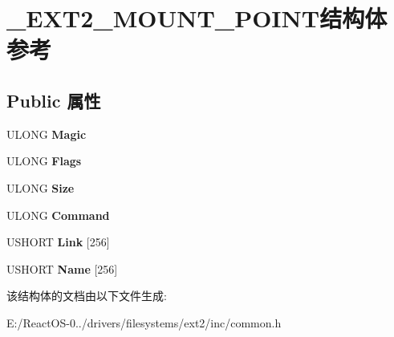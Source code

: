 \hypertarget{struct___e_x_t2___m_o_u_n_t___p_o_i_n_t}{}\section{\+\_\+\+E\+X\+T2\+\_\+\+M\+O\+U\+N\+T\+\_\+\+P\+O\+I\+N\+T结构体 参考}
\label{struct___e_x_t2___m_o_u_n_t___p_o_i_n_t}
\subsection*{Public 属性}
\begin{DoxyCompactItemize}
\item 
\mbox{\label{struct___e_x_t2___m_o_u_n_t___p_o_i_n_t_a653d6546384c7fb891c2a42f1d60fdb9}} 
U\+L\+O\+NG {\bfseries Magic}
\item 
\mbox{\label{struct___e_x_t2___m_o_u_n_t___p_o_i_n_t_a05347be872c52e4419e8b40987cc467c}} 
U\+L\+O\+NG {\bfseries Flags}
\item 
\mbox{\label{struct___e_x_t2___m_o_u_n_t___p_o_i_n_t_ac05225222e45f979fc83489e881f8ee5}} 
U\+L\+O\+NG {\bfseries Size}
\item 
\mbox{\label{struct___e_x_t2___m_o_u_n_t___p_o_i_n_t_a7a0ce0d85b786b72392cb1be751de27b}} 
U\+L\+O\+NG {\bfseries Command}
\item 
\mbox{\label{struct___e_x_t2___m_o_u_n_t___p_o_i_n_t_afe62e53922c99cff8e47a11a14f45981}} 
U\+S\+H\+O\+RT {\bfseries Link} \mbox{[}256\mbox{]}
\item 
\mbox{\label{struct___e_x_t2___m_o_u_n_t___p_o_i_n_t_aac627ad096cd5e14b5c0b3a41a13ab4c}} 
U\+S\+H\+O\+RT {\bfseries Name} \mbox{[}256\mbox{]}
\end{DoxyCompactItemize}


该结构体的文档由以下文件生成\+:\begin{DoxyCompactItemize}
\item 
E\+:/\+React\+O\+S-\/0../drivers/filesystems/ext2/inc/common.\+h\end{DoxyCompactItemize}
